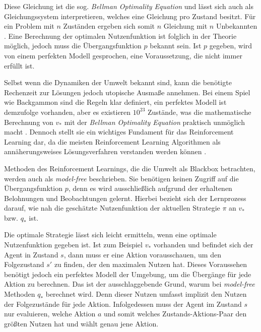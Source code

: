 Diese Gleichung ist die sog. \textit{Bellman Optimality Equation} und lässt sich auch als Gleichungssystem interpretieren, welches eine Gleichung pro Zustand besitzt. Für ein Problem mit $n$ Zuständen ergeben sich somit $n$ Gleichung mit $n$ Unbekannten \cite[S.~63]{Sutton1998}. Eine Berechnung der optimalen Nutzenfunktion ist folglich in der Theorie möglich, jedoch muss die Übergangsfunktion $p$ bekannt sein. Ist $p$ gegeben, wird von einem perfekten Modell gesprochen, eine Voraussetzung, die nicht immer erfüllt ist.
\par 
Selbst wenn die Dynamiken der Umwelt bekannt sind, kann die benötigte Rechenzeit zur Lösungen jedoch utopische Ausmaße annehmen. Bei einem Spiel wie \glqq Backgammon\grqq{} sind die Regeln klar definiert, ein perfektes Modell ist demzufolge vorhanden, aber es existieren $10^{23}$ Zustände, was die mathematische Berechnung von $v_*$ mit der \textit{Bellman Optimality Equation} praktisch unmöglich macht \cite[S.~66]{Sutton1998}. Dennoch stellt sie ein wichtiges Fundament für das Reinforcement Learning dar, da die meisten Reinforcement Learning Algorithmen als annäherungsweises Lösungsverfahren verstanden werden können \cite[S.~66]{Sutton1998}. 
\par 
Methoden des Reinforcement Learnings, die die Umwelt als Blackbox betrachten, werden auch als \textit{model-free} beschrieben. Sie benötigen keinen Zugriff auf die Übergangsfunktion $p$, denn es wird ausschließlich aufgrund der erhaltenen Belohnungen und Beobachtungen gelernt. Hierbei bezieht sich der Lernprozess darauf, wie nah die geschätzte Nutzenfunktion der aktuellen Strategie $\pi$ an $v_*$ bzw. $q_*$ ist.
\par 
Die optimale Strategie lässt sich leicht ermitteln, wenn eine optimale Nutzenfunktion gegeben ist. Ist zum Beispiel $v_*$ vorhanden und befindet sich der Agent in Zustand $s$, dann muss er eine Aktion vorausschauen, um den Folgezustand $s'$ zu finden, der den maximalen Nutzen hat. Dieses Voraussehen benötigt jedoch ein perfektes Modell der Umgebung, um die Übergänge für jede Aktion zu berechnen. Das ist der ausschlaggebende Grund, warum bei \textit{model-free} Methoden $q_*$ berechnet wird. Denn dieser Nutzen umfasst implizit den Nutzen der Folgezustände für jede Aktion. Infolgedessen muss der Agent im Zustand $s$ nur evaluieren, welche Aktion $a$ und somit welches Zustands-Aktions-Paar den größten Nutzen hat und wählt genau jene Aktion.
\par 

\par 